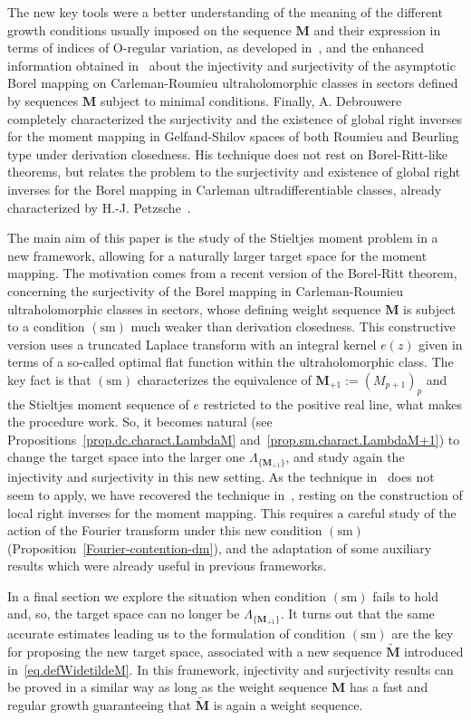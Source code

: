 \documentclass[12pt,a4paper]{article}
\newcommand{\M}{{\boldsymbol{M}}}
\newcommand{\sm}{\operatorname{(sm)}}
\theoremstyle{plain}
\theoremstyle{definition}
\numberwithin{equation}{section}
\begin{document}
The new key tools were a better understanding of the meaning of the different growth conditions usually imposed on the sequence $\M$ and their expression in terms of indices of O-regular variation, as developed in~\cite{JimenezSanzSchindlIndex}, and the enhanced information obtained in~\cite{JG-S-S} about the injectivity and surjectivity of the asymptotic Borel mapping on Carleman-Roumieu ultraholomorphic classes in sectors defined by sequences $\M$ subject to minimal conditions. Finally, A. Debrouwere~\cite{momentsdebrouwere} completely characterized the surjectivity and the existence of global right inverses for the moment mapping in Gelfand-Shilov spaces of both Roumieu and Beurling type under derivation closedness. His technique does not rest on Borel-Ritt-like theorems, but relates the problem to the surjectivity and existence of global right inverses for the Borel mapping in Carleman ultradifferentiable classes, already characterized by H.-J. Petzsche~\cite{Petzsche88}.

The main aim of this paper is the study of the Stieltjes moment problem in a new framework, allowing for a naturally larger target space for the moment mapping. The motivation comes from a recent version of the Borel-Ritt theorem, concerning the surjectivity of the Borel mapping in Carleman-Roumieu ultraholomorphic classes in sectors, whose defining weight sequence $\M$ is subject to a condition $\sm$ much weaker than derivation closedness. This constructive version uses a truncated Laplace transform with an integral kernel $e(z)$ given in terms of a so-called optimal flat function within the ultraholomorphic class. The key fact is that $\sm$ characterizes the equivalence of $\M_{+1}:=(M_{p+1})_p$ and the Stieltjes moment sequence of $e$ restricted to the positive real line, what makes the procedure work. So, it becomes natural (see Propositions~\ref{prop.dc.charact.LambdaM} and~\ref{prop.sm.charact.LambdaM+1}) to change the target space into the larger one $\Lambda_{\{\M_{+1}\}}$, and study again the injectivity and surjectivity in this new setting. As the technique in~\cite{momentsdebrouwere} does not seem to apply, we have recovered the technique in~\cite{L-S09}, resting on the construction of local right inverses for the moment mapping. This requires a careful study of the action of the Fourier transform under this new condition $\sm$ (Proposition~\ref{Fourier-contention-dm}), and the adaptation of some auxiliary results which were already useful in previous frameworks.

In a final section we explore the situation when condition $\sm$ fails to hold and, so, the target space can no longer be $\Lambda_{\{\M_{+1}\}}$. It turns out that the same accurate estimates leading us to the formulation of condition $\sm$ are the key for proposing the new target space, associated with a new sequence $\widetilde{\M}$ introduced in~\eqref{eq.defWidetildeM}. In this framework, injectivity and surjectivity results can be proved in a similar way as long as the weight sequence $\M$ has a fast and regular growth guaranteeing that $\widetilde{\M}$ is again a weight sequence.
\end{document}
